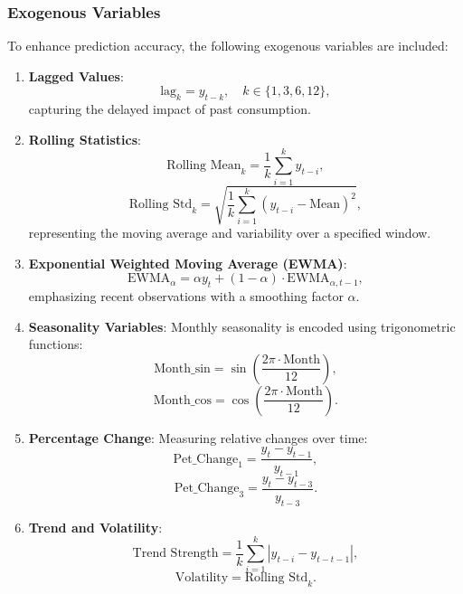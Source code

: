 \documentclass[journal]{IEEEtran}
\begin{document}
\subsubsection{Exogenous Variables}
To enhance prediction accuracy, the following exogenous variables are included:

\begin{enumerate}
    \item \textbf{Lagged Values}:
    \begin{equation}
    \text{lag}_{k}=y_{t-k},\quad k\in\{1,3,6,12\},
    \end{equation}
    capturing the delayed impact of past consumption.

    \item \textbf{Rolling Statistics}:
    \begin{equation}
    \text{Rolling Mean}_{k}=\frac{1}{k}\sum_{i=1}^{k}y_{t-i},
    \end{equation}
    \begin{equation}
    \text{Rolling Std}_{k}=\sqrt{\frac{1}{k}\sum_{i=1}^{k}(y_{t-i}-\text{Mean})^{2}},
    \end{equation}
    representing the moving average and variability over a specified window.

    \item \textbf{Exponential Weighted Moving Average (EWMA)}:
    \begin{equation}
    \text{EWMA}_{\alpha}=\alpha y_{t}+(1-\alpha)\cdot\text{EWMA}_{\alpha,t-1},
    \end{equation}
    emphasizing recent observations with a smoothing factor \(\alpha\).

    \item \textbf{Seasonality Variables}: Monthly seasonality is encoded using trigonometric functions:
    \begin{equation}
    \text{Month\_sin}=\sin\left(\frac{2\pi\cdot\text{Month}}{12}\right),
    \end{equation}
    \begin{equation}
    \text{Month\_cos}=\cos\left(\frac{2\pi\cdot\text{Month}}{12}\right).
    \end{equation}

    \item \textbf{Percentage Change}: Measuring relative changes over time:
    \begin{equation}
    \text{Pet\_Change}_{1}=\frac{y_{t}-y_{t-1}}{y_{t-1}},
    \end{equation}
    \begin{equation}
    \text{Pet\_Change}_{3}=\frac{y_{t}-y_{t-3}}{y_{t-3}}.
    \end{equation}

    \item \textbf{Trend and Volatility}:
    \begin{equation}
    \text{Trend Strength}=\frac{1}{k}\sum_{i=1}^{k}|y_{t-i}-y_{t-t-1}|,
    \end{equation}
    \begin{equation}
    \text{Volatility}=\text{Rolling Std}_{k}.
    \end{equation}
\end{enumerate}
\end{document}
